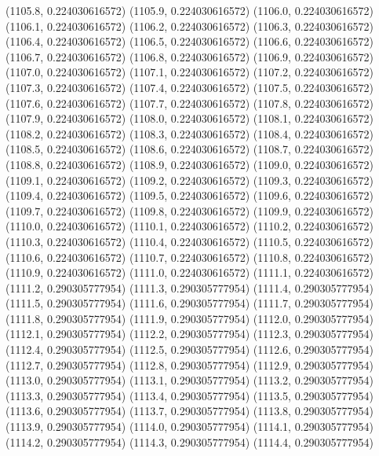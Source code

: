 {					(1105.8, 0.224030616572)
					(1105.9, 0.224030616572)
					(1106.0, 0.224030616572)
					(1106.1, 0.224030616572)
					(1106.2, 0.224030616572)
					(1106.3, 0.224030616572)
					(1106.4, 0.224030616572)
					(1106.5, 0.224030616572)
					(1106.6, 0.224030616572)
					(1106.7, 0.224030616572)
					(1106.8, 0.224030616572)
					(1106.9, 0.224030616572)
					(1107.0, 0.224030616572)
					(1107.1, 0.224030616572)
					(1107.2, 0.224030616572)
					(1107.3, 0.224030616572)
					(1107.4, 0.224030616572)
					(1107.5, 0.224030616572)
					(1107.6, 0.224030616572)
					(1107.7, 0.224030616572)
					(1107.8, 0.224030616572)
					(1107.9, 0.224030616572)
					(1108.0, 0.224030616572)
					(1108.1, 0.224030616572)
					(1108.2, 0.224030616572)
					(1108.3, 0.224030616572)
					(1108.4, 0.224030616572)
					(1108.5, 0.224030616572)
					(1108.6, 0.224030616572)
					(1108.7, 0.224030616572)
					(1108.8, 0.224030616572)
					(1108.9, 0.224030616572)
					(1109.0, 0.224030616572)
					(1109.1, 0.224030616572)
					(1109.2, 0.224030616572)
					(1109.3, 0.224030616572)
					(1109.4, 0.224030616572)
					(1109.5, 0.224030616572)
					(1109.6, 0.224030616572)
					(1109.7, 0.224030616572)
					(1109.8, 0.224030616572)
					(1109.9, 0.224030616572)
					(1110.0, 0.224030616572)
					(1110.1, 0.224030616572)
					(1110.2, 0.224030616572)
					(1110.3, 0.224030616572)
					(1110.4, 0.224030616572)
					(1110.5, 0.224030616572)
					(1110.6, 0.224030616572)
					(1110.7, 0.224030616572)
					(1110.8, 0.224030616572)
					(1110.9, 0.224030616572)
					(1111.0, 0.224030616572)
					(1111.1, 0.224030616572)
					(1111.2, 0.290305777954)
					(1111.3, 0.290305777954)
					(1111.4, 0.290305777954)
					(1111.5, 0.290305777954)
					(1111.6, 0.290305777954)
					(1111.7, 0.290305777954)
					(1111.8, 0.290305777954)
					(1111.9, 0.290305777954)
					(1112.0, 0.290305777954)
					(1112.1, 0.290305777954)
					(1112.2, 0.290305777954)
					(1112.3, 0.290305777954)
					(1112.4, 0.290305777954)
					(1112.5, 0.290305777954)
					(1112.6, 0.290305777954)
					(1112.7, 0.290305777954)
					(1112.8, 0.290305777954)
					(1112.9, 0.290305777954)
					(1113.0, 0.290305777954)
					(1113.1, 0.290305777954)
					(1113.2, 0.290305777954)
					(1113.3, 0.290305777954)
					(1113.4, 0.290305777954)
					(1113.5, 0.290305777954)
					(1113.6, 0.290305777954)
					(1113.7, 0.290305777954)
					(1113.8, 0.290305777954)
					(1113.9, 0.290305777954)
					(1114.0, 0.290305777954)
					(1114.1, 0.290305777954)
					(1114.2, 0.290305777954)
					(1114.3, 0.290305777954)
					(1114.4, 0.290305777954)
}
